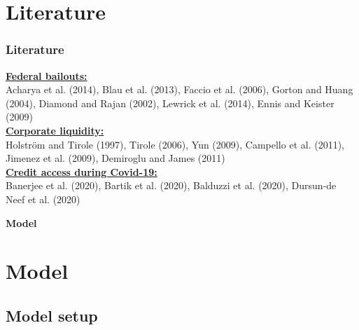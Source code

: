 \documentclass[13.8pt]{beamer}
\begin{document}
\section{Literature}

\begin{frame}
\frametitle{Literature}
\textbf{\large\underline{Federal bailouts:}}\\ 
Acharya et al. (2014), Blau et al. (2013), Faccio et al. (2006), Gorton and Huang (2004), Diamond and Rajan (2002), Lewrick et al. (2014), Ennis and Keister (2009) \\
\vspace{0.5cm}
\textbf{\large\underline{Corporate liquidity:}}\\
Holström and Tirole (1997), Tirole (2006), Yun (2009), Campello et al. (2011), Jimenez et al. (2009), Demiroglu and James (2011)\\
\vspace{0.5cm}
\textbf{\large\underline{Credit access during Covid-19:}}\\
Banerjee et al. (2020), Bartik et al. (2020), Balduzzi et al. (2020), Dursun-de Neef et al. (2020)


\end{frame}


\begin{frame}
\thispagestyle{empty}
\centering
\LARGE \textbf{Model}
\end{frame}


\section{Model}
\subsection{Model setup}
\end{document}
